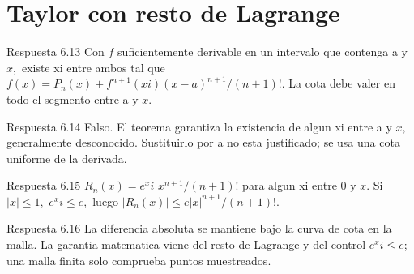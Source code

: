 \documentclass[10pt,a4paper,oneside,openany]{book}
\begin{document}
\section{Taylor con resto de Lagrange}
\begin{PSevenAnswerFixed}{Respuesta 6.13}
Con \(f\) suficientemente derivable en un intervalo que contenga a y \(x,\) existe xi entre ambos tal que \(f(x)=P_n(x)+f^{n+1}(xi)(x-a)^{n+1}/(n+1)!\). La cota debe valer en todo el segmento entre a y \(x\).
\end{PSevenAnswerFixed}
\begin{PSevenAnswerFixed}{Respuesta 6.14}
Falso. El teorema garantiza la existencia de algun xi entre a y \(x,\) generalmente desconocido. Sustituirlo por a no esta justificado; se usa una cota uniforme de la derivada.
\end{PSevenAnswerFixed}
\begin{PSevenAnswerFixed}{Respuesta 6.15}
\(R_n(x)=e^xi\) \(x^{n+1}/(n+1)\)! para algun xi entre \(0\) y \(x\). Si \(|x|\le 1,\) \(e^xi\le e,\) luego \(|R_n(x)|\le e|x|^{n+1}/(n+1)!\).
\end{PSevenAnswerFixed}
\begin{PSevenAnswerFixed}{Respuesta 6.16}
La diferencia absoluta se mantiene bajo la curva de cota en la malla. La garantia matematica viene del resto de Lagrange y del control \(e^xi\le e\); una malla finita solo comprueba puntos muestreados.
\end{PSevenAnswerFixed}
\end{document}
